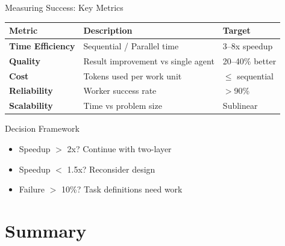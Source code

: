 \documentclass[aspectratio=169,11pt]{beamer}
\begin{document}
\begin{frame}{Measuring Success: Key Metrics}
\begin{center}
\begin{tabular}{>{\bfseries}l p{5cm} p{3cm}}
\toprule
Metric & Description & Target \\
\midrule
Time Efficiency & Sequential / Parallel time & 3--8x speedup \\
\addlinespace
Quality & Result improvement vs single agent & 20--40\% better \\
\addlinespace
Cost & Tokens used per work unit & $\leq$ sequential \\
\addlinespace
Reliability & Worker success rate & $>$90\% \\
\addlinespace
Scalability & Time vs problem size & Sublinear \\
\bottomrule
\end{tabular}
\end{center}

\vspace{0.3cm}
\begin{block}{Decision Framework}
\begin{itemize}
    \item Speedup $>$ 2x? Continue with two-layer
    \item Speedup $<$ 1.5x? Reconsider design
    \item Failure $>$ 10\%? Task definitions need work
\end{itemize}
\end{block}
\end{frame}

\section{Summary}
\end{document}
